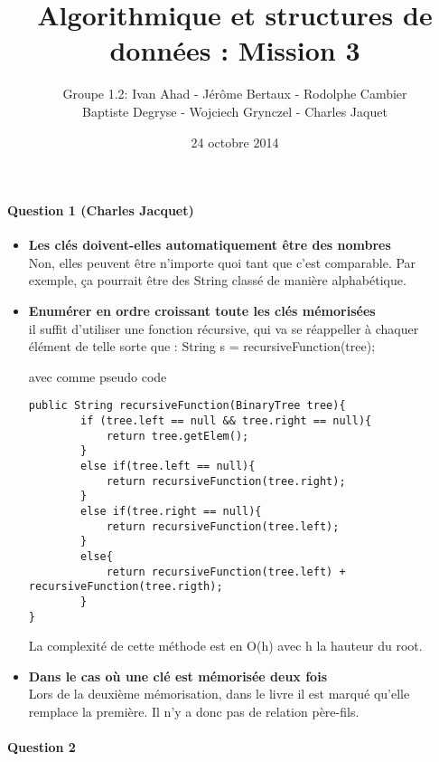 \documentclass[a4paper]{article}
\title{Algorithmique et structures de données : Mission 3}
\date{24 octobre 2014}
\author{Groupe 1.2: Ivan Ahad - Jérôme Bertaux - Rodolphe Cambier \\ 
	Baptiste Degryse - Wojciech Grynczel - Charles Jaquet}
\begin{document}
\maketitle

\paragraph*{Question 1 (Charles Jacquet)}
\begin{itemize}
\item{\textbf{Les clés doivent-elles automatiquement être des nombres}}\\
Non, elles peuvent être n'importe quoi tant que c'est comparable.
Par exemple, ça pourrait être des String classé de manière alphabétique.
\item{\textbf{Enumérer en ordre croissant toute les clés mémorisées}}\\
il suffit d'utiliser une fonction récursive, qui va se réappeller à chaquer élément de telle sorte que :
String s = recursiveFunction(tree);

avec comme pseudo code
\begin{verbatim}
public String recursiveFunction(BinaryTree tree){
		if (tree.left == null && tree.right == null){
			return tree.getElem();
		}
		else if(tree.left == null){
			return recursiveFunction(tree.right);
		}
		else if(tree.right == null){
			return recursiveFunction(tree.left);
		}
		else{
			return recursiveFunction(tree.left) + recursiveFunction(tree.rigth);
		}
}
\end{verbatim}
La complexité de cette méthode est en O(h) avec h la hauteur du root.

\item{\textbf{Dans le cas où une clé est mémorisée deux fois}}\\
Lors de la deuxième mémorisation, dans le livre il est marqué qu'elle remplace la première. Il n'y a donc pas de relation père-fils.

\end{itemize}
\paragraph*{Question 2}
\end{document}
